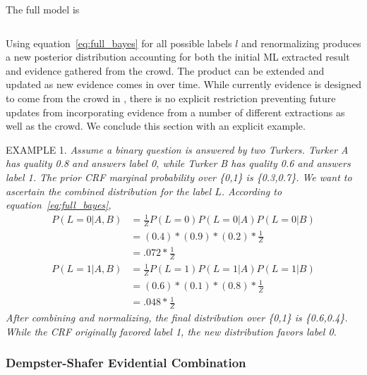 The full model is

\begin{equation}
\label{eq:full_bayes}
\end{equation}

Using equation~\ref{eq:full_bayes} for all possible labels $l$ and renormalizing produces a new posterior distribution accounting for both the initial ML extracted result and evidence gathered from the crowd.  The product can be extended and updated as new evidence comes in over time.  While currently evidence is designed to come from the crowd in \sysName , there is no explicit restriction preventing future updates from incorporating evidence from a number of different extractions as well as the crowd.  We conclude this section with an explicit example.

EXAMPLE 1. \textit{
Assume a binary question is answered by two Turkers.  Turker A has quality 0.8 and answers label 0, while Turker B has quality 0.6 and answers label 1.  The prior CRF marginal probability over \{0,1\} is \{0.3,0.7\}.  We want to ascertain the combined distribution for the label $L$.  According to equation~\ref{eq:full_bayes}, 
\begin{align}
P(L=0|A,B) &= \frac{1}{Z}P(L=0)P(L=0|A)P(L=0|B)\\
	        &= (0.4)*(0.9)*(0.2)*\frac{1}{Z}\\
	        &= .072*\frac{1}{Z}\\
P(L=1|A,B) &= \frac{1}{Z}P(L=1)P(L=1|A)P(L=1|B)\\
	        &= (0.6)*(0.1)*(0.8)*\frac{1}{Z}\\
	        &= .048*\frac{1}{Z}
\end{align}
After combining and normalizing, the final distribution over \{0,1\} is \{0.6,0.4\}.  While the CRF originally favored label 1, the new distribution favors label 0.
}

\subsubsection{Dempster-Shafer Evidential Combination}

